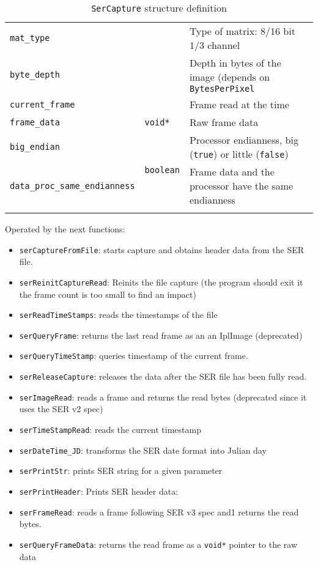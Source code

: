 \documentclass[a4paper,11pt]{memoir}
\begin{document}
\begin{center}
\begin{longtable}{|m{}|m{}|m{}|}
\texttt{mat\_type} & & Type of matrix: 8/16 bit 1/3 channel \\ \cline{1-1} \cline{3-3}
\texttt{byte\_depth} & & Depth in bytes of the image (depends on \texttt{BytesPerPixel} \\ \cline{1-1} \cline{3-3}
\texttt{current\_frame} & & Frame read at the time \\ \hline
\texttt{frame\_data} & \texttt{void*} & Raw frame data \\ \hline
\texttt{big\_endian} & \multirow{2}{*}{\texttt{boolean}} & Processor endianness, big (\texttt{true}) or little (\texttt{false}) \\ \cline{1-1} \cline{3-3}
\texttt{data\_proc\_same\_endianness} & & Frame data and the processor have the same endianness \\ \hline
\caption{\texttt{SerCapture} structure definition}
\label{my-label}
\end{longtable}
\end{center}

Operated by the next functions:
\begin{itemize}
\item \texttt{serCaptureFromFile}: starts capture and obtains header data from the SER file.
\item  \texttt{serReinitCaptureRead}: Reinits the file capture (the program should exit it the
frame count is too small to find an impact)
\item  \texttt{serReadTimeStamps}: reads the timestamps of the file
\item  \texttt{serQueryFrame}: returns the last read frame as an an IplImage (deprecated)
\item  \texttt{serQueryTimeStamp}: queries timestamp of the current frame.
\item  \texttt{serReleaseCapture}: releases the data after the SER file has been fully read.
\item  \texttt{serImageRead}: reads a frame and returns the read bytes (deprecated since it uses
the SER v2 spec)
\item  \texttt{serTimeStampRead}: reads the current timestamp
\item  \texttt{serDateTime\_JD}: transforms the SER date format into Julian day
\item  \texttt{serPrintStr}: prints SER string for a given parameter
\item  \texttt{serPrintHeader}: Prints SER header data:
\item  \texttt{serFrameRead}: reads a frame following SER v3 spec and1 returns the read bytes.
\item  \texttt{serQueryFrameData}: returns the read frame as a \texttt{void*} pointer to the raw data
\end{itemize}
\end{document}
